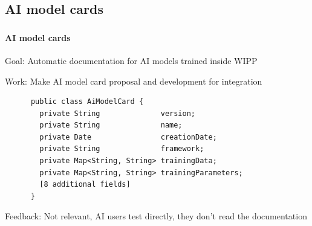 \def\slidetitle{AI model cards}

\subsection{\slidetitle}
\begin{frame}[containsverbatim]
  \frametitle{\sectiontitle}
  \framesubtitle{\slidetitle}

  Goal: Automatic documentation for AI models trained inside WIPP

  Work: Make AI model card proposal and development for integration

  \begin{listing}[H]
    \begin{verbatim}
      public class AiModelCard {
        private String              version;
        private String              name;
        private Date                creationDate;
        private String              framework;
        private Map<String, String> trainingData;
        private Map<String, String> trainingParameters;
        [8 additional fields]
      }
    \end{verbatim}
  \end{listing}

  Feedback: Not relevant, AI users test directly, they don't read the documentation

\end{frame}

